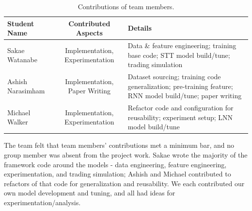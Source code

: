 \documentclass[10pt,twocolumn,letterpaper]{article}
\begin{document}
\begin{table}
\begin{tabular}{|l|c|p{8cm}|}
\hline
Student Name & Contributed Aspects & Details \\
\hline\hline
Sakae Watanabe & Implementation, Experimentation & Data \& feature engineering; training base code; STT model build/tune; trading simulation\\
Ashish Narasimham & Implementation, Paper Writing & Dataset sourcing; training code generalization; pre-training feature; RNN model build/tune; paper writing \\
Michael Walker & Implementation, Experimentation & Refactor code and configuration for reusability; experiment setup; LNN model build/tune \\
\hline
\end{tabular}
\caption{Contributions of team members.}
\label{tab:contributions}
\end{table}

The team felt that team members’ contributions met a minimum bar, and no group member was absent from the project work. Sakae wrote the majority of the framework code around the models - data engineering, feature engineering, experimentation, and trading simulation; Ashish and Michael contributed to refactors of that code for generalization and reusability. We each contributed our own model development and tuning, and all had ideas for experimentation/analysis.
\end{document}
